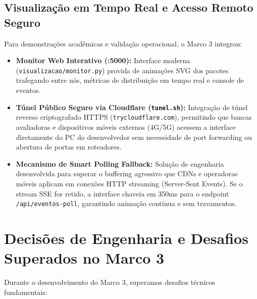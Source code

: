 \documentclass[12pt,a4paper]{article}
\begin{document}
	\subsection{Visualização em Tempo Real e Acesso Remoto Seguro}
	Para demonstrações acadêmicas e validação operacional, o Marco 3 integrou:
	\begin{itemize}
		\item \textbf{Monitor Web Interativo (:5000):} Interface moderna (\texttt{visualizacao/monitor.py}) provida de animações SVG dos pacotes trafegando entre nós, métricas de distribuição em tempo real e console de eventos.
		\item \textbf{Túnel Público Seguro via Cloudflare (\texttt{tunel.sh}):} Integração de túnel reverso criptografado HTTPS (\texttt{trycloudflare.com}), permitindo que bancas avaliadoras e dispositivos móveis externos (4G/5G) acessem a interface diretamente do PC do desenvolvedor sem necessidade de port forwarding ou abertura de portas em roteadores.
		\item \textbf{Mecanismo de Smart Polling Fallback:} Solução de engenharia desenvolvida para superar o buffering agressivo que CDNs e operadoras móveis aplicam em conexões HTTP streaming (Server-Sent Events). Se o stream SSE for retido, a interface chaveia em 350ms para o endpoint \texttt{/api/eventos-poll}, garantindo animação contínua e sem travamentos.
	\end{itemize}
	
	\section{Decisões de Engenharia e Desafios Superados no Marco 3}
	
	Durante o desenvolvimento do Marco 3, superamos desafios técnicos fundamentais:
	
\end{document}
